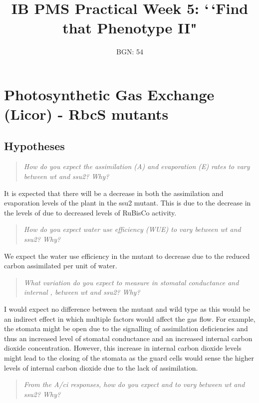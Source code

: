 \documentclass[
]{article}
\title{IB PMS Practical Week 5: `\,`Find that Phenotype II"}
\author{BGN: 54}
\date{}
\begin{document}
\maketitle

\section{Photosynthetic Gas Exchange (Licor) - RbcS
mutants}\label{photosynthetic-gas-exchange-licor---rbcs-mutants}

\subsection{Hypotheses}\label{hypotheses}

\begin{quote}
\emph{How do you expect the assimilation (A) and evaporation (E) rates
to vary between wt and ssu2? Why?}
\end{quote}

It is expected that there will be a decrease in both the assimilation
and evaporation levels of the plant in the ssu2 mutant. This is due to
the decrease in the levels of {} due to decreased levels of RuBisCo
activity.

\begin{quote}
\emph{How do you expect water use efficiency (WUE) to vary between wt
and ssu2? Why?}
\end{quote}

We expect the water use efficiency in the mutant to decrease due to the
reduced carbon assimilated per unit of water.

\begin{quote}
\emph{What variation do you expect to measure in stomatal conductance {}
and internal {}, {} between wt and ssu2? Why?}
\end{quote}

I would expect no difference between the mutant and wild type as this
would be an indirect effect in which multiple factors would affect the
gas flow. For example, the stomata might be open due to the signalling
of assimilation deficiencies and thus an increased level of stomatal
conductance and an increased internal carbon dioxide concentration.
However, this increase in internal carbon dioxide levels might lead to
the closing of the stomata as the guard cells would sense the higher
levels of internal carbon dioxide due to the lack of assimilation.

\begin{quote}
\emph{From the A/ci responses, how do you expect {} and {} to vary
between wt and ssu2? Why?}
\end{quote}
\end{document}
